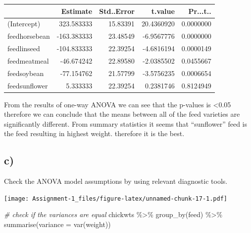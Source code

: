 \documentclass[
]{article}
\newenvironment{Shaded}{\begin{snugshade}}{\end{snugshade}}
\newcommand{\AttributeTok}[1]{\textcolor[rgb]{0.77,0.63,0.00}{#1}}
\newcommand{\CommentTok}[1]{\textcolor[rgb]{0.56,0.35,0.01}{\textit{#1}}}
\newcommand{\FunctionTok}[1]{\textcolor[rgb]{0.00,0.00,0.00}{#1}}
\newcommand{\NormalTok}[1]{#1}
\newcommand{\SpecialCharTok}[1]{\textcolor[rgb]{0.00,0.00,0.00}{#1}}
\begin{document}
\begin{tabular}{l|r|r|r|r}
\hline
  & Estimate & Std..Error & t.value & Pr...t..\\
\hline
(Intercept) & 323.583333 & 15.83391 & 20.4360920 & 0.0000000\\
\hline
feedhorsebean & -163.383333 & 23.48549 & -6.9567776 & 0.0000000\\
\hline
feedlinseed & -104.833333 & 22.39254 & -4.6816194 & 0.0000149\\
\hline
feedmeatmeal & -46.674242 & 22.89580 & -2.0385502 & 0.0455667\\
\hline
feedsoybean & -77.154762 & 21.57799 & -3.5756235 & 0.0006654\\
\hline
feedsunflower & 5.333333 & 22.39254 & 0.2381746 & 0.8124949\\
\hline
\end{tabular}

From the results of one-way ANOVA we can see that the p-values is
\textless0.05 therefore we can conclude that the means between all of
the feed varieties are significantly different. From summary statistics
it seems that ``sunflower'' feed is the feed resulting in highest
weight. therefore it is the best.

\hypertarget{c-3}{%
\subsection{c)}\label{c-3}}

Check the ANOVA model assumptions by using relevant diagnostic tools.

\begin{Shaded}
\end{Shaded}

\texttt{[image: Assignment-1\_files/figure-latex/unnamed-chunk-17-1.pdf]}

\begin{Shaded}
\begin{Highlighting}[]
\CommentTok{\# check if the variances are equal}
\NormalTok{chickwts }\SpecialCharTok{\%\textgreater{}\%} 
  \FunctionTok{group\_by}\NormalTok{(feed) }\SpecialCharTok{\%\textgreater{}\%} 
  \FunctionTok{summarise}\NormalTok{(}\AttributeTok{variance =} \FunctionTok{var}\NormalTok{(weight))}
\end{Highlighting}
\end{Shaded}
\end{document}
